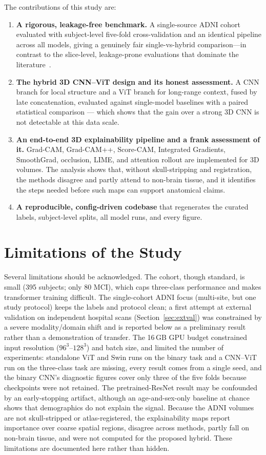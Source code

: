 The contributions of this study are:
\begin{enumerate}
    \item \textbf{A rigorous, leakage-free benchmark.} A single-source ADNI cohort evaluated with subject-level five-fold cross-validation and an identical pipeline across all models, giving a genuinely fair single-vs-hybrid comparison—in contrast to the slice-level, leakage-prone evaluations that dominate the literature~\cite{wen2020convolutional,yagis2021effect}.
    \item \textbf{The hybrid 3D CNN–ViT design and its honest assessment.} A CNN branch for local structure and a ViT branch for long-range context, fused by late concatenation, evaluated against single-model baselines with a paired statistical comparison --- which shows that the gain over a strong 3D CNN is not detectable at this data scale.
    \item \textbf{An end-to-end 3D explainability pipeline and a frank assessment of it.} Grad-CAM, Grad-CAM++, Score-CAM, Integrated Gradients, SmoothGrad, occlusion, LIME, and attention rollout are implemented for 3D volumes. The analysis shows that, without skull-stripping and registration, the methods disagree and partly attend to non-brain tissue, and it identifies the steps needed before such maps can support anatomical claims.
    \item \textbf{A reproducible, config-driven codebase} that regenerates the curated labels, subject-level splits, all model runs, and every figure.
\end{enumerate}

\section{Limitations of the Study}
Several limitations should be acknowledged. The cohort, though standard, is small (395 subjects; only 80 MCI), which caps three-class performance and makes transformer training difficult. The single-cohort ADNI focus (multi-site, but one study protocol) keeps the labels and protocol clean; a first attempt at external validation on independent hospital scans (Section~\ref{sec:extval}) was constrained by a severe modality/domain shift and is reported below as a preliminary result rather than a demonstration of transfer. The 16\,GB GPU budget constrained input resolution ($96^3$–$128^3$) and batch size, and limited the number of experiments: standalone ViT and Swin runs on the binary task and a CNN–ViT run on the three-class task are missing, every result comes from a single seed, and the binary CNN's diagnostic figures cover only three of the five folds because checkpoints were not retained. The pretrained-ResNet result may be confounded by an early-stopping artifact, although an age-and-sex-only baseline at chance shows that demographics do not explain the signal. Because the ADNI volumes are not skull-stripped or atlas-registered, the explainability maps report importance over coarse spatial regions, disagree across methods, partly fall on non-brain tissue, and were not computed for the proposed hybrid. These limitations are documented here rather than hidden.

